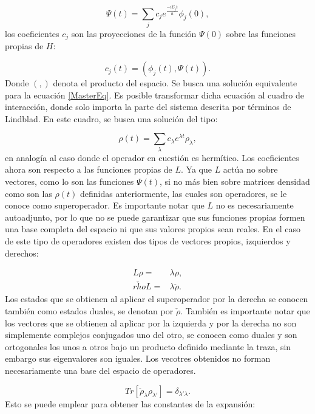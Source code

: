 \documentclass[a4paper,10pt]{report}
\begin{document}
\begin{equation}
\Psi(t) = \sum_j c_j e^{\frac{-iE_jt}{\hbar}}\phi_j(0),
\end{equation}los coeficientes $c_j$ son las proyecciones de la función $\Psi(0)$ sobre las funciones propias de $H$:

\begin{equation}
c_j(t)= (\phi_j(t),\Psi(t)).
\end{equation}Donde $(,)$ denota el producto del espacio. Se busca una solución equivalente para la ecuación \eqref{MasterEq}. Es posible transformar dicha ecuación al cuadro de interacción, donde solo importa la parte del sistema descrita por términos de Lindblad. En este cuadro, se busca una solución del tipo:

\begin{equation}
\rho(t) = \sum_{\lambda} c_{\lambda} e^{\lambda t}\rho_{\lambda} ,
\end{equation}en analogía al caso donde el operador en cuestión es hermítico. Los coeficientes ahora son respecto a las funciones propias de $L$. Ya que $L$ actúa no sobre vectores, como lo son las funciones $\Psi(t)$, si no más bien sobre matrices densidad como son las $\rho(t)$ definidas anteriormente, las cuales son operadores, se le conoce como superoperador. Es importante notar que $L$ no es necesariamente autoadjunto, por lo que no se puede garantizar que sus funciones propias formen una base completa del espacio ni que sus valores propios sean reales. En el caso de este tipo de operadores existen dos tipos de vectores propios\cite{BarnettSD}, izquierdos y derechos:

\begin{align*}
L\rho =& \lambda \rho, \\
\check{rho} L =& \lambda \check{\rho}.
\end{align*} Los estados que se obtienen al aplicar el superoperador por la derecha se conocen también como estados duales, se denotan por $\check{\rho}$. También es importante notar que los vectores que se obtienen al aplicar por la izquierda y por la derecha no son simplemente complejos conjugados uno del otro, se conocen como duales y son ortogonales los unos a otros bajo un producto definido mediante la traza\cite{EnglertDB}, sin embargo sus eigenvalores son iguales. Los vecotres obtenidos no forman necesariamente una base del espacio de operadores. 

\begin{equation}
Tr[\check{\rho}_\lambda \rho_{\lambda'}] = \delta_{\lambda'\lambda}.
\end{equation} Esto se puede emplear para obtener las constantes de la expansión:
\end{document}
